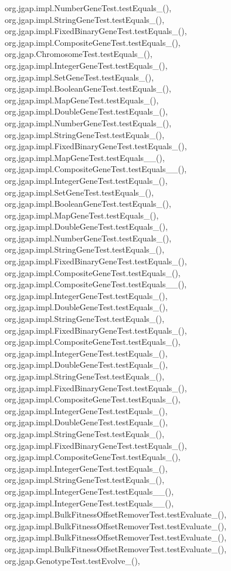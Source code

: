 org.\-jgap.\-impl.\-Number\-Gene\-Test.\-test\-Equals\-\_(), org.\-jgap.\-impl.\-String\-Gene\-Test.\-test\-Equals\-\_(), org.\-jgap.\-impl.\-Fixed\-Binary\-Gene\-Test.\-test\-Equals\-\_(), org.\-jgap.\-impl.\-Composite\-Gene\-Test.\-test\-Equals\-\_(), org.\-jgap.\-Chromosome\-Test.\-test\-Equals\-\_(), org.\-jgap.\-impl.\-Integer\-Gene\-Test.\-test\-Equals\-\_(), org.\-jgap.\-impl.\-Set\-Gene\-Test.\-test\-Equals\-\_(), org.\-jgap.\-impl.\-Boolean\-Gene\-Test.\-test\-Equals\-\_(), org.\-jgap.\-impl.\-Map\-Gene\-Test.\-test\-Equals\-\_(), org.\-jgap.\-impl.\-Double\-Gene\-Test.\-test\-Equals\-\_(), org.\-jgap.\-impl.\-Number\-Gene\-Test.\-test\-Equals\-\_(), org.\-jgap.\-impl.\-String\-Gene\-Test.\-test\-Equals\-\_(), org.\-jgap.\-impl.\-Fixed\-Binary\-Gene\-Test.\-test\-Equals\-\_(), org.\-jgap.\-impl.\-Map\-Gene\-Test.\-test\-Equals\-\_\-\_(), org.\-jgap.\-impl.\-Composite\-Gene\-Test.\-test\-Equals\-\_\-\_(), org.\-jgap.\-impl.\-Integer\-Gene\-Test.\-test\-Equals\-\_(), org.\-jgap.\-impl.\-Set\-Gene\-Test.\-test\-Equals\-\_(), org.\-jgap.\-impl.\-Boolean\-Gene\-Test.\-test\-Equals\-\_(), org.\-jgap.\-impl.\-Map\-Gene\-Test.\-test\-Equals\-\_(), org.\-jgap.\-impl.\-Double\-Gene\-Test.\-test\-Equals\-\_(), org.\-jgap.\-impl.\-Number\-Gene\-Test.\-test\-Equals\-\_(), org.\-jgap.\-impl.\-String\-Gene\-Test.\-test\-Equals\-\_(), org.\-jgap.\-impl.\-Fixed\-Binary\-Gene\-Test.\-test\-Equals\-\_(), org.\-jgap.\-impl.\-Composite\-Gene\-Test.\-test\-Equals\-\_(), org.\-jgap.\-impl.\-Composite\-Gene\-Test.\-test\-Equals\-\_\-\_(), org.\-jgap.\-impl.\-Integer\-Gene\-Test.\-test\-Equals\-\_(), org.\-jgap.\-impl.\-Double\-Gene\-Test.\-test\-Equals\-\_(), org.\-jgap.\-impl.\-String\-Gene\-Test.\-test\-Equals\-\_(), org.\-jgap.\-impl.\-Fixed\-Binary\-Gene\-Test.\-test\-Equals\-\_(), org.\-jgap.\-impl.\-Composite\-Gene\-Test.\-test\-Equals\-\_(), org.\-jgap.\-impl.\-Integer\-Gene\-Test.\-test\-Equals\-\_(), org.\-jgap.\-impl.\-Double\-Gene\-Test.\-test\-Equals\-\_(), org.\-jgap.\-impl.\-String\-Gene\-Test.\-test\-Equals\-\_(), org.\-jgap.\-impl.\-Fixed\-Binary\-Gene\-Test.\-test\-Equals\-\_(), org.\-jgap.\-impl.\-Composite\-Gene\-Test.\-test\-Equals\-\_(), org.\-jgap.\-impl.\-Integer\-Gene\-Test.\-test\-Equals\-\_(), org.\-jgap.\-impl.\-Double\-Gene\-Test.\-test\-Equals\-\_(), org.\-jgap.\-impl.\-String\-Gene\-Test.\-test\-Equals\-\_(), org.\-jgap.\-impl.\-Fixed\-Binary\-Gene\-Test.\-test\-Equals\-\_(), org.\-jgap.\-impl.\-Composite\-Gene\-Test.\-test\-Equals\-\_(), org.\-jgap.\-impl.\-Integer\-Gene\-Test.\-test\-Equals\-\_(), org.\-jgap.\-impl.\-String\-Gene\-Test.\-test\-Equals\-\_(), org.\-jgap.\-impl.\-Integer\-Gene\-Test.\-test\-Equals\-\_\-\_(), org.\-jgap.\-impl.\-Integer\-Gene\-Test.\-test\-Equals\-\_\-\_(), org.\-jgap.\-impl.\-Bulk\-Fitness\-Offset\-Remover\-Test.\-test\-Evaluate\-\_(), org.\-jgap.\-impl.\-Bulk\-Fitness\-Offset\-Remover\-Test.\-test\-Evaluate\-\_(), org.\-jgap.\-impl.\-Bulk\-Fitness\-Offset\-Remover\-Test.\-test\-Evaluate\-\_(), org.\-jgap.\-impl.\-Bulk\-Fitness\-Offset\-Remover\-Test.\-test\-Evaluate\-\_(), org.\-jgap.\-Genotype\-Test.\-test\-Evolve\-\_(), 